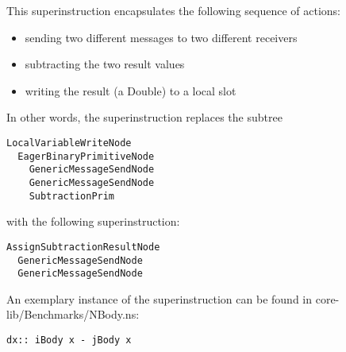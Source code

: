 \documentclass[10pt,a4paper]{article}
\begin{document}
This superinstruction encapsulates the following sequence of actions:

\begin{itemize}
	\item sending two different messages to two different receivers
	\item subtracting the two result values
	\item writing the result (a Double) to a local slot
\end{itemize}
In other words, the superinstruction replaces the subtree
\begin{verbatim}
LocalVariableWriteNode
  EagerBinaryPrimitiveNode
    GenericMessageSendNode
    GenericMessageSendNode
    SubtractionPrim
\end{verbatim}
with the following superinstruction:
\begin{verbatim}
AssignSubtractionResultNode
  GenericMessageSendNode
  GenericMessageSendNode
\end{verbatim}
An exemplary instance of the superinstruction can be found in \textsf{core-lib/Benchmarks/NBody.ns}:
\begin{verbatim}
dx:: iBody x - jBody x
\end{verbatim}
\end{document}
